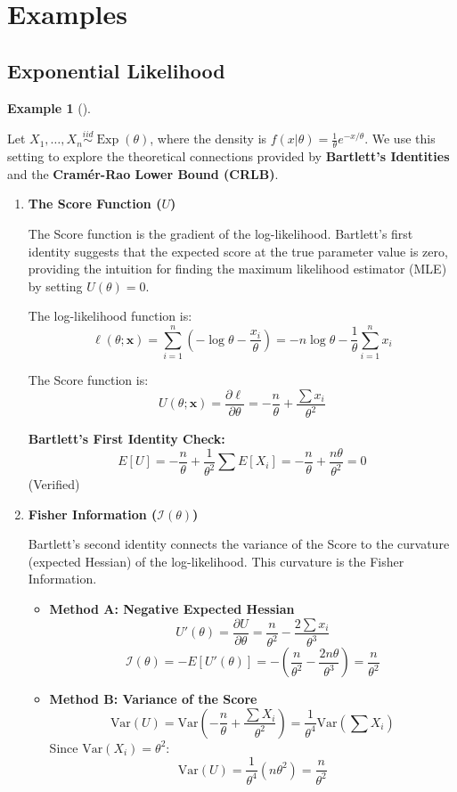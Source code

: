 \documentclass[
  letterpaper,
  DIV=11,
  numbers=noendperiod]{scrreprt}
\renewcommand{\[}{\begin{equation}}
\renewcommand{\]}{\end{equation}}
\theoremstyle{definition}
\theoremstyle{plain}
\theoremstyle{plain}
\theoremstyle{plain}
\theoremstyle{definition}
\newtheorem{example}{Example}[chapter]
\theoremstyle{plain}
\theoremstyle{remark}
\begin{document}
\section{Examples}\label{examples}

\subsection{Exponential Likelihood}\label{exponential-likelihood}

\begin{example}[]\protect\hypertarget{exm-exponential-crlb}{}\label{exm-exponential-crlb}

Let \(X_1, \dots, X_n \overset{iid}{\sim} \operatorname{Exp}(\theta)\),
where the density is \(f(x|\theta) = \frac{1}{\theta} e^{-x/\theta}\).
We use this setting to explore the theoretical connections provided by
\textbf{Bartlett's Identities} and the \textbf{Cramér-Rao Lower Bound
(CRLB)}.

\begin{enumerate}
\def\labelenumi{\arabic{enumi}.}
\item
  \textbf{The Score Function (\(U\))}

  The Score function is the gradient of the log-likelihood. Bartlett's
  first identity suggests that the expected score at the true parameter
  value is zero, providing the intuition for finding the maximum
  likelihood estimator (MLE) by setting \(U(\theta) = 0\).

  The log-likelihood function is: \[
  \ell(\theta; \mathbf{x}) = \sum_{i=1}^n \left( -\log \theta - \frac{x_i}{\theta} \right) = -n \log \theta - \frac{1}{\theta} \sum_{i=1}^n x_i
  \]

  The Score function is: \[
  U(\theta; \mathbf{x}) = \frac{\partial \ell}{\partial \theta} = -\frac{n}{\theta} + \frac{\sum x_i}{\theta^2}
  \]

  \textbf{Bartlett's First Identity Check:}
  \[E[U] = -\frac{n}{\theta} + \frac{1}{\theta^2} \sum E[X_i] = -\frac{n}{\theta} + \frac{n\theta}{\theta^2} = 0\]
  (Verified)
\item
  \textbf{Fisher Information (\(\mathcal{I}(\theta)\))}

  Bartlett's second identity connects the variance of the Score to the
  curvature (expected Hessian) of the log-likelihood. This curvature is
  the Fisher Information.

  \begin{itemize}
  \item
    \textbf{Method A: Negative Expected Hessian} \[
    U'(\theta) = \frac{\partial U}{\partial \theta} = \frac{n}{\theta^2} - \frac{2\sum x_i}{\theta^3}
    \] \[
    \mathcal{I}(\theta) = -E[U'(\theta)] = -\left( \frac{n}{\theta^2} - \frac{2 n \theta}{\theta^3} \right) = \frac{n}{\theta^2}
    \]
  \item
    \textbf{Method B: Variance of the Score} \[
    \text{Var}(U) = \text{Var}\left( -\frac{n}{\theta} + \frac{\sum X_i}{\theta^2} \right) = \frac{1}{\theta^4} \text{Var}\left( \sum X_i \right)
    \] Since \(\text{Var}(X_i) = \theta^2\): \[
    \text{Var}(U) = \frac{1}{\theta^4} (n \theta^2) = \frac{n}{\theta^2}
    \]
  \end{itemize}


\end{enumerate}
\end{example}
\end{document}
